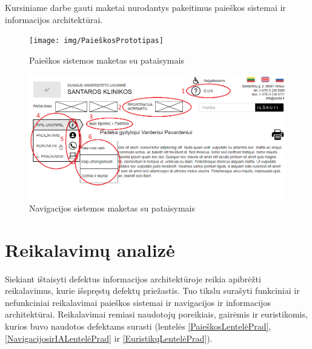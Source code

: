 \documentclass{VUMIFPSkursinis}
\begin{document}
Kursiniame darbe gauti maketai nurodantys pakeitimus paieškos sistemai ir informacijos architektūrai.

\begin{figure}[H]
    \centering
    \texttt{[image: img/PaieškosPrototipas]}
    \caption{Paieškos sistemos maketas su pataisymais}
    \label{img:PaieškosPrototipas}
\end{figure}

\begin{figure}[H]
    \centering
    \includegraphics[scale=0.65]{img/NavigacijosPrototipas}
    \caption{Navigacijos sistemos maketas su pataisymais}
    \label{img:NavigacijosPrototipas}
\end{figure}

\section{Reikalavimų analizė}
Siekiant ištaisyti defektus informacijos architektūroje reikia apibrėžti reikalavimus, kurie išspręstų defektų priežastis. Tuo tikslu surašyti funkciniai ir nefunkciniai reikalavimai paieškos sistemai ir navigacijos ir informacijos architektūrai. Reikalavimai remiasi naudotojų poreikiais, gairėmis ir euristikomis, kurios buvo naudotos defektams surasti (lentelės \ref{PaieškosLentelėPrad}, \ref{NavigacijosirIALentelėPrad} ir \ref{EuristikųLentelėPrad}).
\end{document}
